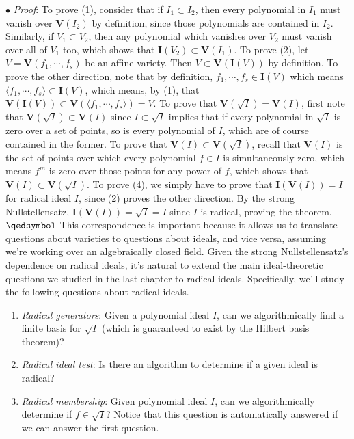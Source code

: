 \documentclass{article}
\newcommand*{\ti}{\textit}
\newcommand*{\n}{\newline}
\newcommand*{\nn}{\newline \newline}
\newcommand*{\fs}{f_1, \cdots, f_s}
\newcommand*{\lfsr}{\langle f_1, \cdots, f_s \rangle}
\newcommand*{\V}{\ensuremath{\mathbf{V}}}
\newcommand*{\I}{\ensuremath{\mathbf{I}}}
\begin{document}
\indent $ \bullet $ \ti{Proof}: To prove (1), consider that if $ I_1 \subset I_2 $, then every polynomial in $ I_1 $ must vanish over $ \V(I_2) $ by definition, since those polynomials are contained in $ I_2 $. Similarly, if $ V_1 \subset V_2 $, then any polynomial which vanishes over $ V_2 $ must vanish over all of $ V_1 $ too, which shows that $ \I(V_2) \subset \V(I_1) $.
\n
\indent To prove (2), let $ V = \V(\fs) $ be an affine variety. Then $ V \subset \V(\I(V)) $ by definition. To prove the other direction, note that by definition, $ \fs \in \I(V) $ which means $ \lfsr \subset \I(V) $, which means, by (1), that $ \V(\I(V)) \subset \V(\lfsr) = V $. To prove that $ \V(\sqrt{I}) = \V(I) $, first note that $ \V(\sqrt{I}) \subset \V(I) $ since $ I \subset \sqrt{I} $ implies that if every polynomial in $ \sqrt{I} $ is zero over a set of points, so is every polynomial of $ I $, which are of course contained in the former. To prove that $ \V(I) \subset \V(\sqrt{I}) $, recall that $ \V(I) $ is the set of points over which every polynomial $ f \in I $ is simultaneously zero, which means $ f^m $ is zero over those points for any power of $ f $, which shows that $ \V(I) \subset \V(\sqrt{I}) $.
\n
\indent To prove (4), we simply have to prove that $ \I(\V(I)) = I $ for radical ideal $ I $, since (2) proves the other direction. By the strong Nullstellensatz, $ \I(\V(I)) = \sqrt{I} = I $ since $ I $ is radical, proving the theorem. $ \qedsymbol $
\nn
This correspondence is important because it allows us to translate questions about varieties to questions about ideals, and vice versa, assuming we're working over an algebraically closed field. Given the strong Nullstellensatz's dependence on radical ideals, it's natural to extend the main ideal-theoretic questions we studied in the last chapter to radical ideals. Specifically, we'll study the following questions about radical ideals.
\begin{enumerate}
	\item \ti{Radical generators}: Given a polynomial ideal $ I $, can we algorithmically find a finite basis for $ \sqrt{I} $ (which is guaranteed to exist by the Hilbert basis theorem)?
	\item \ti{Radical ideal test}: Is there an algorithm to determine if a given ideal is radical?
	\item \ti{Radical membership}: Given polynomial ideal $ I $, can we algorithmically determine if $ f \in \sqrt{I} $? Notice that this question is automatically answered if we can answer the first question.
\end{enumerate}
\end{document}
